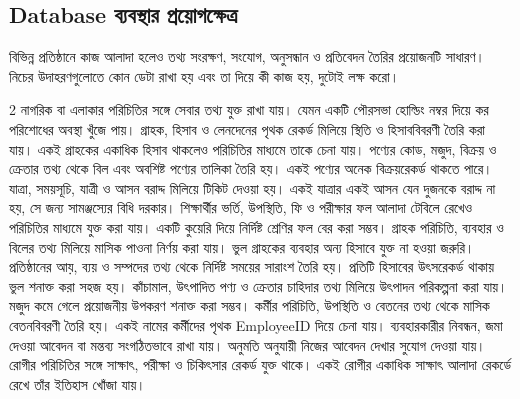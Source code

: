 \subsection{Database ব্যবস্থার প্রয়োগক্ষেত্র}
বিভিন্ন প্রতিষ্ঠানে কাজ আলাদা হলেও তথ্য সংরক্ষণ, সংযোগ, অনুসন্ধান ও প্রতিবেদন তৈরির প্রয়োজনটি সাধারণ। নিচের উদাহরণগুলোতে কোন ডেটা রাখা হয় এবং তা দিয়ে কী কাজ হয়, দুটোই লক্ষ করো।
\begin{multicols}{2}
 নাগরিক বা এলাকার পরিচিতির সঙ্গে সেবার তথ্য যুক্ত রাখা যায়। যেমন একটি পৌরসভা হোল্ডিং নম্বর দিয়ে কর পরিশোধের অবস্থা খুঁজে পায়।
 গ্রাহক, হিসাব ও লেনদেনের পৃথক রেকর্ড মিলিয়ে স্থিতি ও হিসাববিবরণী তৈরি করা যায়। একই গ্রাহকের একাধিক হিসাব থাকলেও পরিচিতির মাধ্যমে তাকে চেনা যায়।
 পণ্যের কোড, মজুদ, বিক্রয় ও ক্রেতার তথ্য থেকে বিল এবং অবশিষ্ট পণ্যের তালিকা তৈরি হয়। একই পণ্যের অনেক বিক্রয়রেকর্ড থাকতে পারে।
 যাত্রা, সময়সূচি, যাত্রী ও আসন বরাদ্দ মিলিয়ে টিকিট দেওয়া হয়। একই যাত্রার একই আসন যেন দুজনকে বরাদ্দ না হয়, সে জন্য সামঞ্জস্যের বিধি দরকার।
 শিক্ষার্থীর ভর্তি, উপস্থিতি, ফি ও পরীক্ষার ফল আলাদা টেবিলে রেখেও পরিচিতির মাধ্যমে যুক্ত করা যায়। একটি কুয়েরি দিয়ে নির্দিষ্ট শ্রেণির ফল বের করা সম্ভব।
 গ্রাহক পরিচিতি, ব্যবহার ও বিলের তথ্য মিলিয়ে মাসিক পাওনা নির্ণয় করা যায়। ভুল গ্রাহকের ব্যবহার অন্য হিসাবে যুক্ত না হওয়া জরুরি।
 প্রতিষ্ঠানের আয়, ব্যয় ও সম্পদের তথ্য থেকে নির্দিষ্ট সময়ের সারাংশ তৈরি হয়। প্রতিটি হিসাবের উৎসরেকর্ড থাকায় ভুল শনাক্ত করা সহজ হয়।
 কাঁচামাল, উৎপাদিত পণ্য ও ক্রেতার চাহিদার তথ্য মিলিয়ে উৎপাদন পরিকল্পনা করা যায়। মজুদ কমে গেলে প্রয়োজনীয় উপকরণ শনাক্ত করা সম্ভব।
 কর্মীর পরিচিতি, উপস্থিতি ও বেতনের তথ্য থেকে মাসিক বেতনবিবরণী তৈরি হয়। একই নামের কর্মীদের পৃথক EmployeeID দিয়ে চেনা যায়।
 ব্যবহারকারীর নিবন্ধন, জমা দেওয়া আবেদন বা মন্তব্য সংগঠিতভাবে রাখা যায়। অনুমতি অনুযায়ী নিজের আবেদন দেখার সুযোগ দেওয়া যায়।
 রোগীর পরিচিতির সঙ্গে সাক্ষাৎ, পরীক্ষা ও চিকিৎসার রেকর্ড যুক্ত থাকে। একই রোগীর একাধিক সাক্ষাৎ আলাদা রেকর্ডে রেখে তাঁর ইতিহাস খোঁজা যায়।

\end{multicols}

